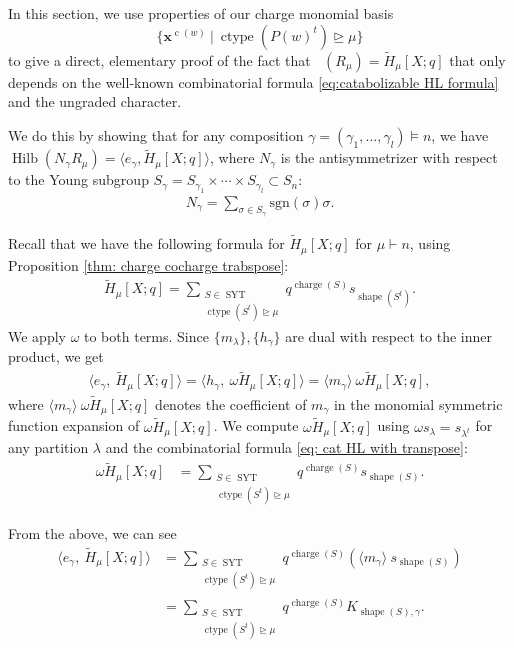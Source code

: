\documentclass[10pt]{amsart}
\theoremstyle{plain}
\theoremstyle{definition}
\theoremstyle{plain}
\theoremstyle{plain}
\theoremstyle{remark}
\theoremstyle{plain}
\theoremstyle{plain}
\DeclareMathOperator{\charge}{charge}
\DeclareMathOperator{\syt}{SYT}
\DeclareMathOperator{\ctype}{ctype}
\DeclareMathOperator{\Frob}{Frob}
\DeclareMathOperator{\Hilb}{Hilb}
\DeclareMathOperator{\shape}{shape}
\DeclareMathOperator{\cw}{c}
\DeclareMathOperator{\Frobq}{\Frob_q}
\newcommand{\mHL}{\tilde{H}}
\begin{document}
In this section, we use properties of our charge monomial basis \[\{\mathbf{x}^{\cw(w)} \ | \ \ctype(P(w)^t)\unrhd \mu\}\] to give a direct, elementary proof of the fact that $\Frobq (R_{\mu}) = \mHL_{\mu}[X;q]$ that only depends on the well-known combinatorial formula \eqref{eq:catabolizable HL formula} and the ungraded character.

We do this by showing that for any composition $\gamma = (\gamma_1,\dots, \gamma_l)\models n$, we have $\Hilb(N_\gamma R_{\mu}) = \langle e_\gamma , \mHL_{\mu}[X;q]\rangle$, where $N_\gamma$ is the antisymmetrizer with respect to the Young subgroup $S_\gamma = S_{\gamma_1}\times \cdots\times  S_{\gamma_l} \subset S_n$:  
\begin{align*}
    N_\gamma = \sum\limits_{\sigma\in S_\gamma} \text{sgn}(\sigma)\sigma.
\end{align*}

Recall that we have the following formula for  $\mHL_{\mu}[X;q]$ for $\mu\vdash n$, using Proposition \ref{thm: charge cocharge trabspose}:
\begin{align}\label{eq: cat HL with transpose}
\mHL_{\mu}[X;q] =  \sum\limits_{\substack{S\in \syt\\  \ctype(S^t)\unrhd\mu}}  q^{\charge(S)} s_{\shape(S^t)}.
\end{align}
We apply $\omega$ to both terms. Since $\{m_\lambda\}, \{h_\gamma\}$ are dual with respect to the inner product, we get
\begin{align*}
     \langle e_{\gamma},\  \mHL_{\mu}  [X;q] \rangle =  \langle h_{\gamma},\  \omega \mHL_{\mu} [X;q] \rangle = \langle m_\gamma\rangle  \ \omega \mHL_{\mu} [X;q] , 
\end{align*}
where $\langle m_\gamma\rangle  \ \omega \mHL_{\mu} [X;q] $ denotes the coefficient of $m_\gamma$ in the monomial symmetric function expansion of $\omega \mHL_{\mu} [X;q] $.
We compute $\omega \mHL_{\mu} [X;q] $ using $\omega s_\lambda = s_{\lambda^t}$ for any partition $\lambda$ and the combinatorial formula \eqref{eq: cat HL with transpose}:
\begin{align*}
    \omega \mHL_{\mu} [X;q]   &= \sum\limits_{\substack{S\in \syt\\  \ctype(S^t)\unrhd\mu}}  q^{\charge(S)}s_{\shape(S)}  .
\end{align*}

From the above, we can see
\begin{align*}
    \langle e_{\gamma},\  \mHL_{\mu}  [X;q] \rangle &=  \sum\limits_{\substack{S \in \syt\\  \ctype(S^t)\unrhd\mu}}  q^{\charge(S)} \left(\langle m_\gamma \rangle \   s_{\shape(S)} \right) \\&= \sum\limits_{\substack{S\in \syt\\  \ctype(S^t)\unrhd\mu}}  q^{\charge(S)}   K_{\shape(S),\gamma}.
\end{align*}
\end{document}
